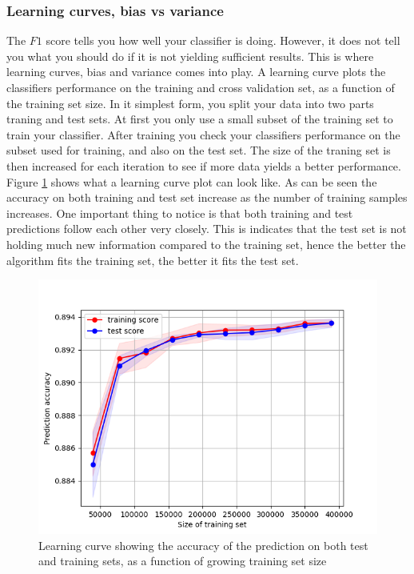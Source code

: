         \subsubsection{Learning curves, bias vs variance}
            The $F1$ score tells you how well your classifier is doing. However, it does not tell you what you should do if it is not yielding sufficient results. This is where learning curves, bias and variance comes into play. A learning curve plots the classifiers performance  on the training and cross validation set, as a function of the training set size. In it simplest form, you split your data into two parts traning and test sets. At first you only use a small subset of the training set to train your classifier. After training you check your classifiers performance on the subset used for training, and also on the test set. The size of the traning set is then increased for each iteration to see if more data yields a better performance. Figure \ref{fig:learning_curves} shows what a learning curve plot can look like. As can be seen the accuracy on both training and test set increase as the number of training samples increases. One important thing to notice is that both training and test predictions follow each other very closely. This is indicates that the test set is not holding much new information compared to the training set, hence the better the algorithm fits the training set, the better it fits the test set.  
            
            \begin{figure}[h]
                \centering
                \includegraphics[scale = 0.8]{figures/machineLearning/LearningCurves.png}
                \caption{Learning curve showing the accuracy of the prediction on both test and training sets, as a function of growing training set size}
                \label{fig:learning_curves}
            \end{figure}
            
